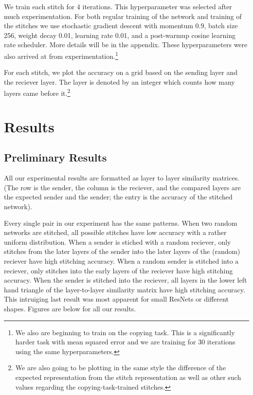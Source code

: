 \documentclass{article} %
\begin{document}
We train each stitch for 4 iterations. This hyperparameter was selected after much experimentation. For both
regular training of the network and training of the stitches we use stochastic gradient descent with momentum 0.9,
batch size 256, weight decay 0.01, learning rate 0.01, and a post-warmup cosine learning rate scheduler. More details will
be in the appendix. These hyperparameters were also arrived at from experimentation.\footnote{We also are beginning to
train on the copying task. This is a significantly harder task with mean squared error and we are training for 30 iterations
using the same hyperparameters.}

For each stitch, we plot the accuracy on a grid based on the sending layer and the reciever layer. The layer is
denoted by an integer which counts how many layers came before it.\footnote{We are also going to be plotting in the same
style the difference of the expected representation from the stitch representation as well as other such values regarding
the copying-task-trained stitches.}

\section*{Results}
\subsection*{Preliminary Results}
All our experimental results are formatted as layer to
layer similarity matrices. (The row is the sender, the column is the reciever, and the compared layers are the expected sender
and the sender; the entry is the accuracy of the stitched network).

Every single pair in our experiment has the same
patterns. When two random networks are stitched, all possible stitches have low accuracy with a rather uniform distribution. When
a sender is stiched with a random reciever, only stitches from the later layers of the sender into the later layers of the (random)
reciever have high stitching accuracy. When a random sender is stitched into a reciever, only stitches into the early layers of the
reciever have high stitching accuracy. When the sender is stitched into the reciever, all layers in the lower left hand triangle
of the layer-to-layer similarity matrix have high stitching accuracy. 
This intruiging last result was most apparent for small ResNets or different shapes.
Figures are below for all our results.
\end{document}
